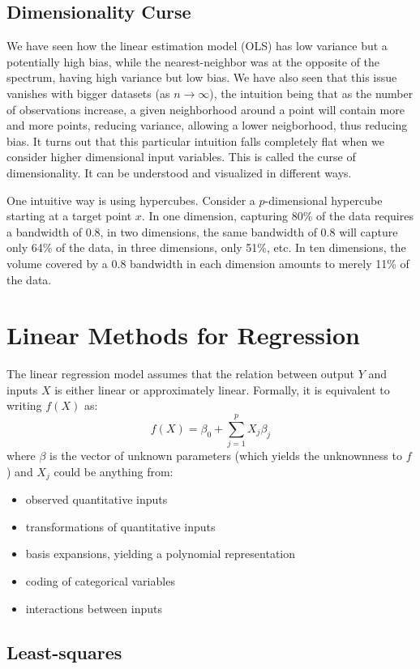 \documentclass[12pt]{report}
\begin{document}
\subsection{Dimensionality Curse}

We have seen how the linear estimation model (OLS) has low variance but a potentially high bias, while the nearest-neighbor was at the opposite of the spectrum, having high variance but low bias. We have also seen that this issue vanishes with bigger datasets (as $n\to\infty$), the intuition being that as the number of observations increase, a given neighborhood around a point will contain more and more points, reducing variance, allowing a lower neigborhood, thus reducing bias. It turns out that this particular intuition falls completely flat when we consider higher dimensional input variables. This is called the curse of dimensionality. It can be understood and visualized in different ways.

One intuitive way is using hypercubes. Consider a $p$-dimensional hypercube starting at a target point $x$. In one dimension, capturing 80\% of the data requires a bandwidth of 0.8, in two dimensions, the same bandwidth of 0.8 will capture only 64\% of the data, in three dimensions, only 51\%, etc.  In ten dimensions, the volume covered by a 0.8 bandwidth in each dimension amounts to merely 11\% of the data. 


\section{Linear Methods for Regression}

The linear regression model assumes that the relation between output $Y$ and inputs $X$ is either linear or approximately linear. Formally, it is equivalent to writing $f(X)$ as: $$ f(X) = \beta_0 + \sum_{j=1}^p X_j\beta_j $$ where $\beta$ is the vector of unknown parameters (which yields the unknownness to $f$) and $X_j$ could be anything from:\begin{itemize}
\item observed quantitative inputs
\item transformations of quantitative inputs
\item basis expansions, yielding a polynomial representation
\item coding of categorical variables
\item interactions between inputs
\end{itemize}

\subsection{Least-squares}
\end{document}
